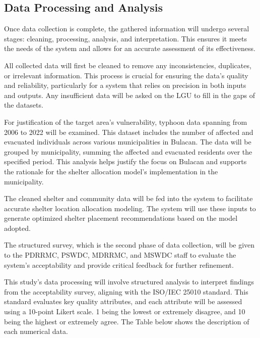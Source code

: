 \subsection{Data Processing and Analysis}

Once data collection is complete, the gathered information will undergo several stages: cleaning, processing, analysis, and interpretation. This ensures it meets the needs of the system and allows for an accurate assessment of its effectiveness.

All collected data will first be cleaned to remove any inconsistencies, duplicates, or irrelevant information. This process is crucial for ensuring the data’s quality and reliability, particularly for a system that relies on precision in both inputs and outputs. Any insufficient data will be asked on the LGU to fill in the gaps of the datasets. 

For justification of the target area’s vulnerability, typhoon data spanning from 2006 to 2022 will be examined. This dataset includes the number of affected and evacuated individuals across various municipalities in Bulacan. The data will be grouped by municipality, summing the affected and evacuated residents over the specified period. This analysis helps justify the focus on Bulacan and supports the rationale for the shelter allocation model’s implementation in the municipality.

The cleaned shelter and community data will be fed into the system to facilitate accurate shelter location allocation modeling. The system will use these inputs to generate optimized shelter placement recommendations based on the model adopted.

The structured survey, which is the second phase of data collection, will be given to the PDRRMC, PSWDC, MDRRMC, and MSWDC staff to evaluate the system's acceptability and provide critical feedback for further refinement.

This study's data processing will involve structured analysis to interpret findings from the acceptability survey, aligning with the ISO/IEC 25010 standard. This standard evaluates key quality attributes, and each attribute will be assessed using a 10-point Likert scale. 1 being the lowest or extremely disagree, and 10 being the highest or extremely agree. The Table below shows the description of each numerical data.


